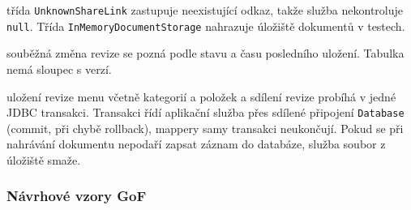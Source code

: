 \begin{description}[itemsep=2pt,style=unboxed]
  \item[Special Case, Service Stub] třída \texttt{UnknownShareLink} zastupuje neexistující odkaz, takže služba nekontroluje \texttt{null}. Třída \texttt{InMemoryDocumentStorage} nahrazuje úložiště dokumentů v testech.
  \item[Optimistic Offline Lock] souběžná změna revize se pozná podle stavu a času posledního uložení. Tabulka nemá sloupec s verzí.
  \item[Transakce] uložení revize menu včetně kategorií a položek a sdílení revize probíhá v jedné JDBC transakci. Transakci řídí aplikační služba přes sdílené připojení \texttt{Database} (commit, při chybě rollback), mappery samy transakci neukončují. Pokud se při nahrávání dokumentu nepodaří zapsat záznam do databáze, služba soubor z úložiště smaže.
\end{description}

\subsubsection*{Návrhové vzory GoF}

